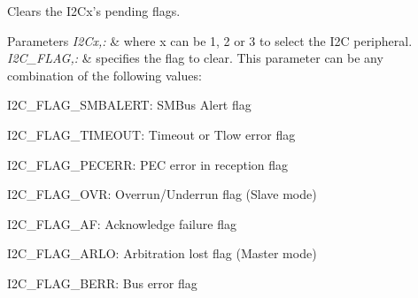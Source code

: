 Clears the I2\-Cx's pending flags. 


\begin{DoxyParams}{Parameters}
{\em I2\-Cx,\-:} & where x can be 1, 2 or 3 to select the I2\-C peripheral. \\
\hline
{\em I2\-C\-\_\-\-F\-L\-A\-G,\-:} & specifies the flag to clear. This parameter can be any combination of the following values\-: \begin{DoxyItemize}
\item I2\-C\-\_\-\-F\-L\-A\-G\-\_\-\-S\-M\-B\-A\-L\-E\-R\-T\-: S\-M\-Bus Alert flag \item I2\-C\-\_\-\-F\-L\-A\-G\-\_\-\-T\-I\-M\-E\-O\-U\-T\-: Timeout or Tlow error flag \item I2\-C\-\_\-\-F\-L\-A\-G\-\_\-\-P\-E\-C\-E\-R\-R\-: P\-E\-C error in reception flag \item I2\-C\-\_\-\-F\-L\-A\-G\-\_\-\-O\-V\-R\-: Overrun/\-Underrun flag (Slave mode) \item I2\-C\-\_\-\-F\-L\-A\-G\-\_\-\-A\-F\-: Acknowledge failure flag \item I2\-C\-\_\-\-F\-L\-A\-G\-\_\-\-A\-R\-L\-O\-: Arbitration lost flag (Master mode) \item I2\-C\-\_\-\-F\-L\-A\-G\-\_\-\-B\-E\-R\-R\-: Bus error flag\end{DoxyItemize}
\\
\hline
\end{DoxyParams}
